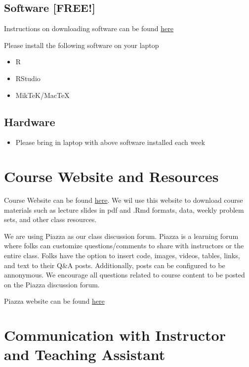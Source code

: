 \documentclass[11pt,]{article}
\providecommand{\tightlist}{%
  \setlength{\itemsep}{0pt}\setlength{\parskip}{0pt}}
\begin{document}
\subsection{Software {[}FREE!{]}}\label{software-free}

Instructions on downloading software can be found
\href{https://github.com/ozanj/rclass/raw/master/educ263_todo.pdf}{here}

Please install the following software on your laptop

\begin{itemize}
\tightlist
\item
  R
\item
  RStudio
\item
  MikTeK/MacTeX
\end{itemize}

\subsection{Hardware}\label{hardware}

\begin{itemize}
\tightlist
\item
  Please bring in laptop with above software installed each week
\end{itemize}

\section{Course Website and
Resources}\label{course-website-and-resources}

Course Website can be found
\href{https://ozanj.github.io/rclass/}{here}. We wil use this website to
download course materials such as lecture slides in pdf and .Rmd
formats, data, weekly problem sets, and other class resources.

We are using Piazza as our class discussion forum. Piazza is a learning
forum where folks can customize questions/comments to share with
instructors or the entire class. Folks have the option to insert code,
images, videos, tables, links, and text to their Q\&A posts.
Additionally, posts can be configured to be annonymous. We encourage all
questions related to course content to be posted on the Piazza
discussion forum.

Piazza website can be found
\href{https://piazza.com/ucla/fall2019/educ263/home}{here}

\section{Communication with Instructor and Teaching
Assistant}\label{communication-with-instructor-and-teaching-assistant}
\end{document}
